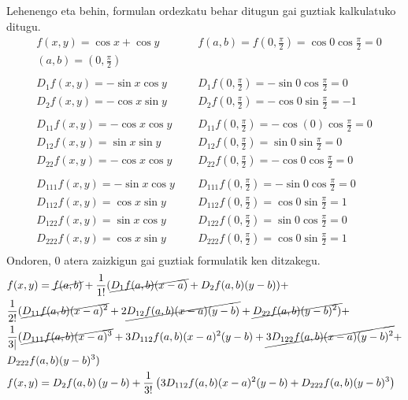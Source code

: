 Lehenengo eta behin, formulan ordezkatu behar ditugun gai guztiak kalkulatuko ditugu.
\begin{equation*}
    \begin{array}{lll}
    & f(x,y)=\cos{x}+\cos{y}\qquad &f(a,b)=f(0,\frac{\pi}{2})=\cos{0}\cos{\frac{\pi}{2}}=0\\
    &(a,b)=(0,\frac{\pi}{2})&\\
    \\
    & D_1f(x,y)=-\sin{x}\cos{y}\qquad & D_1f(0,\frac{\pi}{2})=-\sin{0}\cos{\frac{\pi}{2}}=0 \\
    & D_2f(x,y)=-\cos{x}\sin{y}& D_2f(0,\frac{\pi}{2})=-\cos{0}\sin{\frac{\pi}{2}=-1}\\
    \\
    & D_{11}f(x,y)=-\cos{x}\cos{y}& D_{11}f(0,\frac{\pi}{2})=-\cos(0)\cos{\frac{\pi}{2}}=0\\
    
    & D_{12}f(x,y)=\sin{x}\sin{y} &D_{12}f(0,\frac{\pi}{2})=\sin{0}\sin{\frac{\pi}{2}}=0\\
    
    &D_{22}f(x,y)=-\cos{x}\cos{y}&D_{22}f(0,\frac{\pi}{2})=-\cos{0}\cos{\frac{\pi}{2}}=0\\
    \\
    &D_{111}f(x,y)=-\sin{x}\cos{y}&D_{111}f(0,\frac{\pi}{2})=-\sin{0}\cos{\frac{\pi}{2}}=0\\
    
    &D_{112}f(x,y)=\cos{x}\sin{y}&D_{112}f(0,\frac{\pi}{2})=\cos{0}\sin{\frac{\pi}{2}}=1\\
    
    &D_{122}f(x,y)=\sin{x}\cos{y}&D_{122}f(0,\frac{\pi}{2})=\sin{0}\cos{\frac{\pi}{2}}=0\\
    
    &D_{222}f(x,y)=\cos{x}\sin{y}&D_{222}f(0,\frac{\pi}{2})=\cos{0}\sin{\frac{\pi}{2}}=1\\
    \end{array}
\end{equation*}
Ondoren, 0 atera zaizkigun gai guztiak formulatik ken ditzakegu.
\begin{equation*}
\begin{split}
    &f(x,y)=\cancel{f(a,b)}+\frac{1}{1!}(\cancel{D_1f(a,b)(x-a)}+D_2f(a,b)(y-b))+\\
    &\frac{1}{2!}(\cancel{D_{11}f(a,b)(x-a)^2} +2 \cancel{D_{12}f(a,b)(x-a)(y-b)}+\cancel{D_{22}f(a,b)(y-b)^2)}+\\
    &\frac{1}{3|}(\cancel{D_{111}f(a,b)(x-a)^3}+3D_{112}f(a,b)(x-a)^2(y-b)+\cancel{3D_{122}f(a,b)(x-a)(y-b)^2}+\\
    &D_{222}f(a,b)(y-b)^3)\\
    &f(x,y)=D_2f(a,b)\left(y-b\right)+\frac{1}{3!}\left(3D_{112}f(a,b)(x-a)^2(y-b)+ D_{222}f(a,b)(y-b)^3 \right)\\
    &\\
\end{split}
\end{equation*}
